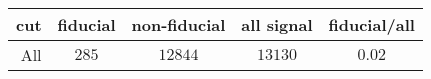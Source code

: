 \begin{tabular}{r|c|c|c|c}
cut&fiducial&non-fiducial&all signal&fiducial/all\\
\hline
All&$285$&$12844$&$13130$&$0.02$\\
\end{tabular}
